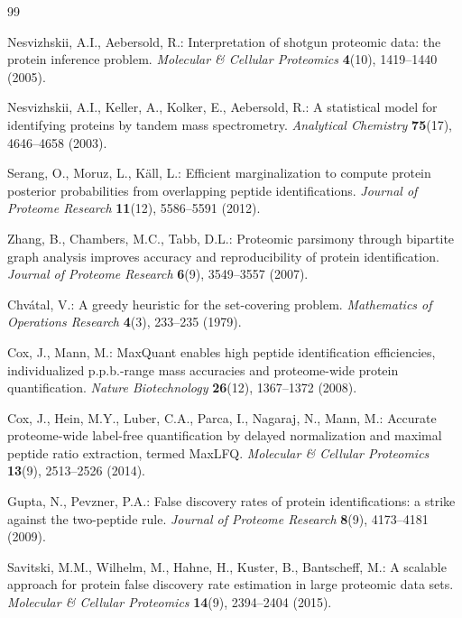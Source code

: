\documentclass[11pt,twoside,openright]{book}
\begin{document}
\begin{thebibliography}{99}
\small

Nesvizhskii, A.I., Aebersold, R.: Interpretation of shotgun proteomic data: the protein inference problem.
\textit{Molecular \& Cellular Proteomics} \textbf{4}(10), 1419--1440 (2005).

Nesvizhskii, A.I., Keller, A., Kolker, E., Aebersold, R.: A statistical model for identifying proteins by tandem mass spectrometry.
\textit{Analytical Chemistry} \textbf{75}(17), 4646--4658 (2003).

Serang, O., Moruz, L., K{\"a}ll, L.: Efficient marginalization to compute protein posterior probabilities from overlapping peptide identifications.
\textit{Journal of Proteome Research} \textbf{11}(12), 5586--5591 (2012).

Zhang, B., Chambers, M.C., Tabb, D.L.: Proteomic parsimony through bipartite graph analysis improves accuracy and reproducibility of protein identification.
\textit{Journal of Proteome Research} \textbf{6}(9), 3549--3557 (2007).

Chv\'atal, V.: A greedy heuristic for the set-covering problem.
\textit{Mathematics of Operations Research} \textbf{4}(3), 233--235 (1979).

Cox, J., Mann, M.: MaxQuant enables high peptide identification efficiencies, individualized p.p.b.-range mass accuracies and proteome-wide protein quantification.
\textit{Nature Biotechnology} \textbf{26}(12), 1367--1372 (2008).

Cox, J., Hein, M.Y., Luber, C.A., Parca, I., Nagaraj, N., Mann, M.: Accurate proteome-wide label-free quantification by delayed normalization and maximal peptide ratio extraction, termed MaxLFQ.
\textit{Molecular \& Cellular Proteomics} \textbf{13}(9), 2513--2526 (2014).

Gupta, N., Pevzner, P.A.: False discovery rates of protein identifications: a strike against the two-peptide rule.
\textit{Journal of Proteome Research} \textbf{8}(9), 4173--4181 (2009).

Savitski, M.M., Wilhelm, M., Hahne, H., Kuster, B., Bantscheff, M.: A scalable approach for protein false discovery rate estimation in large proteomic data sets.
\textit{Molecular \& Cellular Proteomics} \textbf{14}(9), 2394--2404 (2015).


\end{thebibliography}
\end{document}
